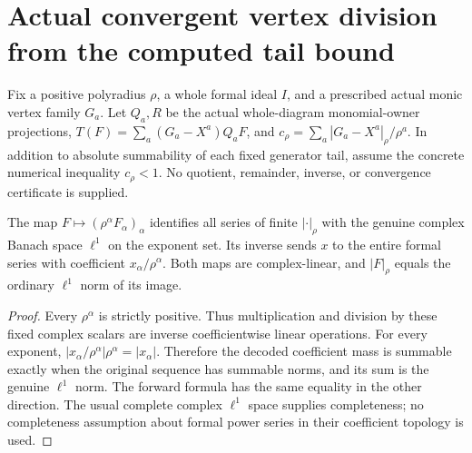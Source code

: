 \section{Actual convergent vertex division from the computed tail bound}
\label{sec:hironaka-actual-vertex-neumann-division}
Fix a positive polyradius $\rho$, a whole formal ideal $I$, and a prescribed actual monic vertex family $G_a$. Let $Q_a,R$ be the actual whole-diagram monomial-owner projections, $T(F)=\sum_a(G_a-X^a)Q_aF$, and $c_\rho=\sum_a|G_a-X^a|_\rho/\rho^a$. In addition to absolute summability of each fixed generator tail, assume the concrete numerical inequality $c_\rho<1$. No quotient, remainder, inverse, or convergence certificate is supplied.

\begin{theorem}
\label{hir:actual-weighted-coefficient-banach-dictionary}
\leanok
The map $F\mapsto(\rho^\alpha F_\alpha)_\alpha$ identifies all series of finite $|\cdot|_\rho$ with the genuine complex Banach space $\ell^1$ on the exponent set. Its inverse sends $x$ to the entire formal series with coefficient $x_\alpha/\rho^\alpha$. Both maps are complex-linear, and $|F|_\rho$ equals the ordinary $\ell^1$ norm of its image.
\end{theorem}
\begin{proof}
Every $\rho^\alpha$ is strictly positive. Thus multiplication and division by these fixed complex scalars are inverse coefficientwise linear operations. For every exponent, $|x_\alpha/\rho^\alpha|\rho^\alpha=|x_\alpha|$. Therefore the decoded coefficient mass is summable exactly when the original sequence has summable norms, and its sum is the genuine $\ell^1$ norm. The forward formula has the same equality in the other direction. The usual complete complex $\ell^1$ space supplies completeness; no completeness assumption about formal power series in their coefficient topology is used.
\end{proof}

